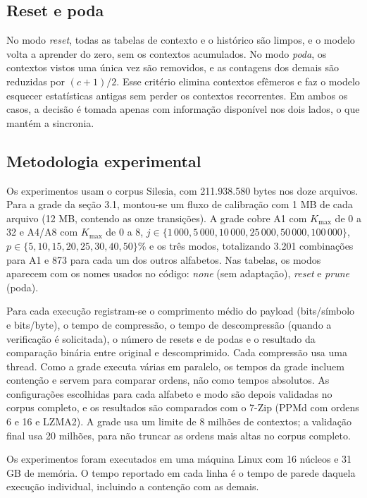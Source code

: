 \documentclass[12pt,a4paper]{article}
\begin{document}
\subsection{Reset e poda}
No modo \emph{reset}, todas as tabelas de contexto e o hist\'orico s\~ao limpos, e o
modelo volta a aprender do zero, sem os contextos acumulados. No modo \emph{poda},
os contextos vistos uma \'unica vez s\~ao removidos, e as contagens dos demais s\~ao
reduzidas por $(c+1)/2$. Esse crit\'erio elimina contextos ef\^emeros e faz o modelo
esquecer estat\'isticas antigas sem perder os contextos recorrentes. Em ambos os
casos, a decis\~ao \'e tomada apenas com informa\c{c}\~ao dispon\'ivel nos dois
lados, o que mant\'em a sincronia.

\subsection{Metodologia experimental}
Os experimentos usam o corpus Silesia, com 211.938.580 bytes nos doze arquivos.
Para a grade da se\c{c}\~ao 3.1, montou-se um fluxo de calibra\c{c}\~ao com 1 MB de
cada arquivo (12 MB, contendo as onze transi\c{c}\~oes). A grade cobre A1 com
$K_{\max}$ de 0 a 32 e A4/A8 com $K_{\max}$ de 0 a 8, $j \in
\{1\,000, 5\,000, 10\,000, 25\,000, 50\,000, 100\,000\}$, $p \in
\{5,10,15,20,25,30,40,50\}\%$ e os tr\^es modos, totalizando 3.201 combina\c{c}\~oes
para A1 e 873 para cada um dos outros alfabetos. Nas tabelas, os modos aparecem
com os nomes usados no c\'odigo: \emph{none} (sem adapta\c{c}\~ao), \emph{reset} e
\emph{prune} (poda).

Para cada execu\c{c}\~ao registram-se o comprimento m\'edio do payload
(bits/s\'imbolo e bits/byte), o tempo de compress\~ao, o tempo de descompress\~ao
(quando a verifica\c{c}\~ao \'e solicitada), o n\'umero de resets e de podas e o
resultado da compara\c{c}\~ao bin\'aria entre original e descomprimido. Cada
compress\~ao usa uma thread. Como a grade executa v\'arias em paralelo, os tempos
da grade incluem conten\c{c}\~ao e servem para comparar ordens, n\~ao como tempos
absolutos. As configura\c{c}\~oes escolhidas para cada alfabeto e modo s\~ao depois
validadas no corpus completo, e os resultados s\~ao comparados com o 7-Zip (PPMd
com ordens 6 e 16 e LZMA2). A grade usa um limite de 8 milh\~oes de contextos; a
valida\c{c}\~ao final usa 20 milh\~oes, para n\~ao truncar as ordens mais altas no
corpus completo.

Os experimentos foram executados em uma m\'aquina Linux com 16 n\'ucleos e 31 GB de
mem\'oria. O tempo reportado em cada linha \'e o tempo de parede daquela execu\c{c}\~ao
individual, incluindo a conten\c{c}\~ao com as demais.
\end{document}
